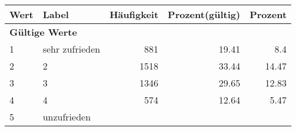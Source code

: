      \begin{longtable}{lXrrr}
     \toprule
     \textbf{Wert} & \textbf{Label} & \textbf{Häufigkeit} & \textbf{Prozent(gültig)} & \textbf{Prozent} \\
     \endhead
     \midrule
     \multicolumn{5}{l}{\textbf{Gültige Werte}}\\

     1 &
     \multicolumn{1}{X}{ sehr zufrieden   } &


       \num{881} &
       \num[round-mode=places,round-precision=2]{19.41} &
         \num[round-mode=places,round-precision=2]{8.4} \\

     2 &
     \multicolumn{1}{X}{ 2   } &


       \num{1518} &
       \num[round-mode=places,round-precision=2]{33.44} &
         \num[round-mode=places,round-precision=2]{14.47} \\

     3 &
     \multicolumn{1}{X}{ 3   } &


       \num{1346} &
       \num[round-mode=places,round-precision=2]{29.65} &
         \num[round-mode=places,round-precision=2]{12.83} \\

     4 &
     \multicolumn{1}{X}{ 4   } &


       \num{574} &
       \num[round-mode=places,round-precision=2]{12.64} &
         \num[round-mode=places,round-precision=2]{5.47} \\

     5 &
     \multicolumn{1}{X}{ unzufrieden   } &



\end{longtable}

